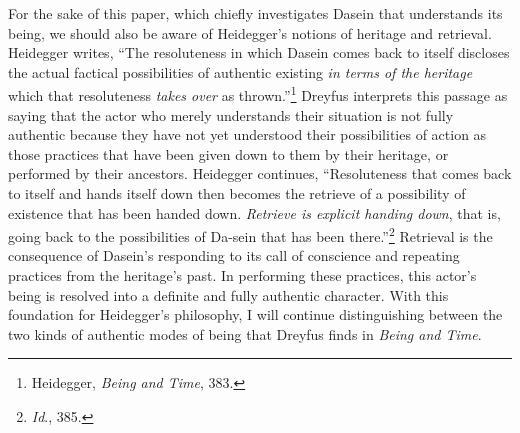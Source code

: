 For the sake of this paper, which chiefly investigates Dasein that
understands its being, we should also be aware of Heidegger's notions of
heritage and retrieval. Heidegger writes, ``The resoluteness in which
Dasein comes back to itself discloses the actual factical possibilities
of authentic existing \emph{in terms of the heritage} which that
resoluteness \emph{takes over} as thrown.''\footnote{Heidegger,
  \emph{Being and Time}, 383.} Dreyfus interprets this passage as saying
that the actor who merely understands their situation is not fully
authentic because they have not yet understood their possibilities of
action as those practices that have been given down to them by their
heritage, or performed by their ancestors. Heidegger continues,
``Resoluteness that comes back to itself and hands itself down then
becomes the retrieve of a possibility of existence that has been handed
down. \emph{Retrieve is explicit handing down}, that is, going back to
the possibilities of Da-sein that has been there.''\footnote{\emph{Id}.,
  385.} Retrieval is the consequence of Dasein's responding to its call
of conscience and repeating practices from the heritage's past. In
performing these practices, this actor's being is resolved into a
definite and fully authentic character. With this foundation for
Heidegger's philosophy, I will continue distinguishing between the two
kinds of authentic modes of being that Dreyfus finds in \emph{Being and
Time}.

